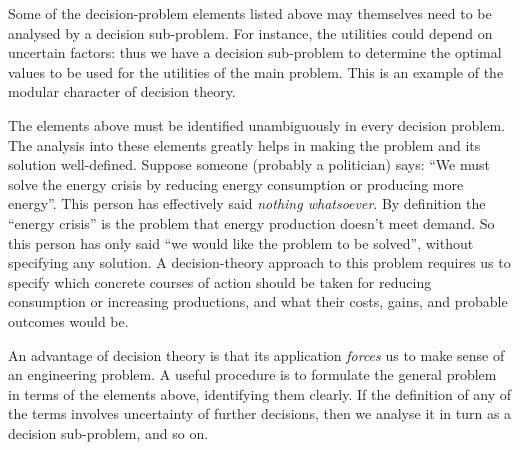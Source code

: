 \documentclass[
  a4paper,
  DIV=11,
  numbers=noendperiod,
  oneside]{scrreprt}
\begin{document}
Some of the decision-problem elements listed above may themselves need
to be analysed by a decision sub-problem. For instance, the utilities
could depend on uncertain factors: thus we have a decision sub-problem
to determine the optimal values to be used for the utilities of the main
problem. This is an example of the modular character of decision theory.

The elements above must be identified unambiguously in every decision
problem. The analysis into these elements greatly helps in making the
problem and its solution well-defined. Suppose someone (probably a
politician) says: ``We must solve the energy crisis by reducing energy
consumption or producing more energy''. This person has effectively said
\emph{nothing whatsoever}. By definition the ``energy crisis'' is the
problem that energy production doesn't meet demand. So this person has
only said ``we would like the problem to be solved'', without specifying
any solution. A decision-theory approach to this problem requires us to
specify which concrete courses of action should be taken for reducing
consumption or increasing productions, and what their costs, gains, and
probable outcomes would be.


An advantage of decision theory is that its application \emph{forces} us
to make sense of an engineering problem. A useful procedure is to
formulate the general problem in terms of the elements above,
identifying them clearly. If the definition of any of the terms involves
uncertainty of further decisions, then we analyse it in turn as a
decision sub-problem, and so on.
\end{document}
